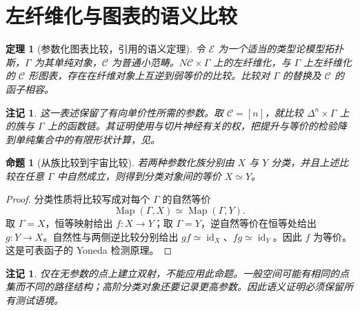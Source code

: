 \documentclass[12pt,oneside,openany,fontset=none]{ctexbook}
\theoremstyle{cn}
\newtheorem{proposition}[definition]{命题}
\newtheorem{theorem}[definition]{定理}
\newtheorem{remark}[definition]{注记}
\numberwithin{equation}{chapter}
\newcommand{\id}{\operatorname{id}}
\newcommand{\Map}{\operatorname{Map}}
\begin{document}
\section{左纤维化与图表的语义比较}
\begin{theorem}[参数化图表比较，引用的语义定理]
令 $\mathcal E$ 为一个适当的类型论模型拓扑斯，$\Gamma$ 为其单纯对象，$\mathcal C$ 为普通小范畴。$N\mathcal C\times\Gamma$ 上的左纤维化，与 $\Gamma$ 上左纤维化的 $\mathcal C$ 形图表，存在在纤维对象上互逆到弱等价的比较。比较对 $\Gamma$ 的替换及 $\mathcal C$ 的函子相容。
\end{theorem}
\begin{remark}
这一表述保留了有向单价性所需的参数。取 $\mathcal C=[n]$，就比较 $\Delta^n\times\Gamma$ 上的族与 $\Gamma$ 上的函数链。其证明使用与切片神经有关的权，把提升与等价的检验降到单纯集合中的有限形状计算，见\cite[定理4.4.4与6.2.5]{CavalloRiehlSattler}。
\end{remark}
\begin{proposition}[从族比较到宇宙比较]
若两种参数化族分别由 $X$ 与 $Y$ 分类，并且上述比较在任意 $\Gamma$ 中自然成立，则得到分类对象间的等价 $X\simeq Y$。
\end{proposition}
\begin{proof}
分类性质将比较写成对每个 $\Gamma$ 的自然等价
\[
\Map(\Gamma,X)\simeq\Map(\Gamma,Y).
\]
取 $\Gamma=X$，恒等映射给出 $f:X\to Y$；取 $\Gamma=Y$，逆自然等价在恒等处给出 $g:Y\to X$。自然性与两侧逆比较分别给出 $gf\simeq\id_X$、$fg\simeq\id_Y$。因此 $f$ 为等价。这是可表函子的 Yoneda 检测原理。
\end{proof}
\begin{remark}
仅在无参数的点上建立双射，不能应用此命题。一般空间可能有相同的点集而不同的路径结构；高阶分类对象还要记录更高参数。因此语义证明必须保留所有测试语境。
\end{remark}
\end{document}

